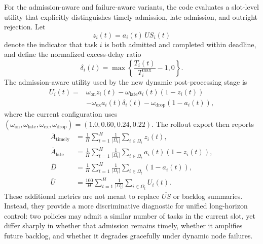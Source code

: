 \documentclass[pdflatex,sn-mathphys-num]{sn-jnl}
\begin{document}
For the admission-aware and failure-aware variants, the code evaluates a slot-level utility that explicitly distinguishes timely admission, late admission, and outright rejection. Let
\begin{equation}
    z_i(t) = a_i(t)\,US_i(t)
\end{equation}
denote the indicator that task $i$ is both admitted and completed within deadline, and define the normalized excess-delay ratio
\begin{equation}
    \delta_i(t) = \max\left\{\frac{T_i(t)}{T_i^{\max}} - 1, 0\right\}.
\end{equation}
The admission-aware utility used by the new dynamic post-processing stage is
\begin{equation}
\begin{aligned}
    U_i(t) ={}& \omega_{\mathrm{on}} z_i(t) - \omega_{\mathrm{late}} a_i(t)\left(1-z_i(t)\right) \\
    &- \omega_{\mathrm{ex}} a_i(t)\delta_i(t) - \omega_{\mathrm{drop}}\left(1-a_i(t)\right),
\end{aligned}
\end{equation}
where the current configuration uses $(\omega_{\mathrm{on}}, \omega_{\mathrm{late}}, \omega_{\mathrm{ex}}, \omega_{\mathrm{drop}}) = (1.0, 0.60, 0.24, 0.22)$. The rollout export then reports
\begin{align}
    \overline{A}_{\mathrm{timely}} &= \frac{1}{H}\sum_{t=1}^{H}\frac{1}{|\Omega_t|}\sum_{i \in \Omega_t} z_i(t),\\
    \overline{A}_{\mathrm{late}} &= \frac{1}{H}\sum_{t=1}^{H}\frac{1}{|\Omega_t|}\sum_{i \in \Omega_t} a_i(t)\left(1-z_i(t)\right),\\
    \overline{D} &= \frac{1}{H}\sum_{t=1}^{H}\frac{1}{|\Omega_t|}\sum_{i \in \Omega_t} \left(1-a_i(t)\right),\\
    \overline{U} &= \frac{100}{H}\sum_{t=1}^{H}\frac{1}{|\Omega_t|}\sum_{i \in \Omega_t} U_i(t).
\end{align}
These additional metrics are not meant to replace $\overline{US}$ or backlog summaries. Instead, they provide a more discriminative diagnostic for unified long-horizon control: two policies may admit a similar number of tasks in the current slot, yet differ sharply in whether that admission remains timely, whether it amplifies future backlog, and whether it degrades gracefully under dynamic node failures.



\end{document}
